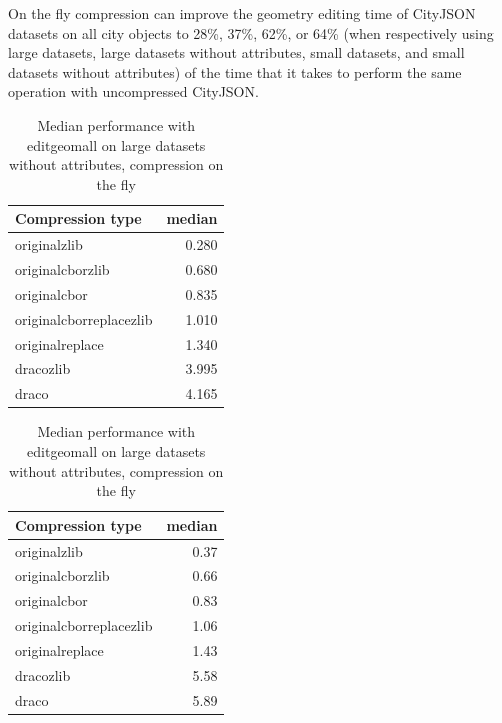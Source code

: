 On the fly compression can improve the geometry editing time of CityJSON datasets on all city objects to 28\%, 37\%, 62\%, or 64\% (when respectively using large datasets, large datasets without attributes, small datasets, and small datasets without attributes) of the time that it takes to perform the same operation with uncompressed CityJSON.


\begin{table}[!h]
    \begin{minipage}{.5\linewidth}
      \caption{
Median performance with editgeomall on large datasets, compression on the fly}
\centering

\begin{tabular}{|l|r|}
\hline
Compression type & median\\
\hline
originalzlib & 0.280\\
\hline
originalcborzlib & 0.680\\
\hline
originalcbor & 0.835\\
\hline
originalcborreplacezlib & 1.010\\
\hline
originalreplace & 1.340\\
\hline
dracozlib & 3.995\\
\hline
draco & 4.165\\
\hline
\end{tabular}
\end{minipage}%
    \begin{minipage}{.5\linewidth}
      \centering
        \caption{
Median performance with editgeomall on large datasets without attributes, compression on the fly}

\begin{tabular}{|l|r|}
\hline
Compression type & median\\
\hline
originalzlib & 0.37\\
\hline
originalcborzlib & 0.66\\
\hline
originalcbor & 0.83\\
\hline
originalcborreplacezlib & 1.06\\
\hline
originalreplace & 1.43\\
\hline
dracozlib & 5.58\\
\hline
draco & 5.89\\
\hline
\end{tabular}
\end{minipage} 
\end{table}
